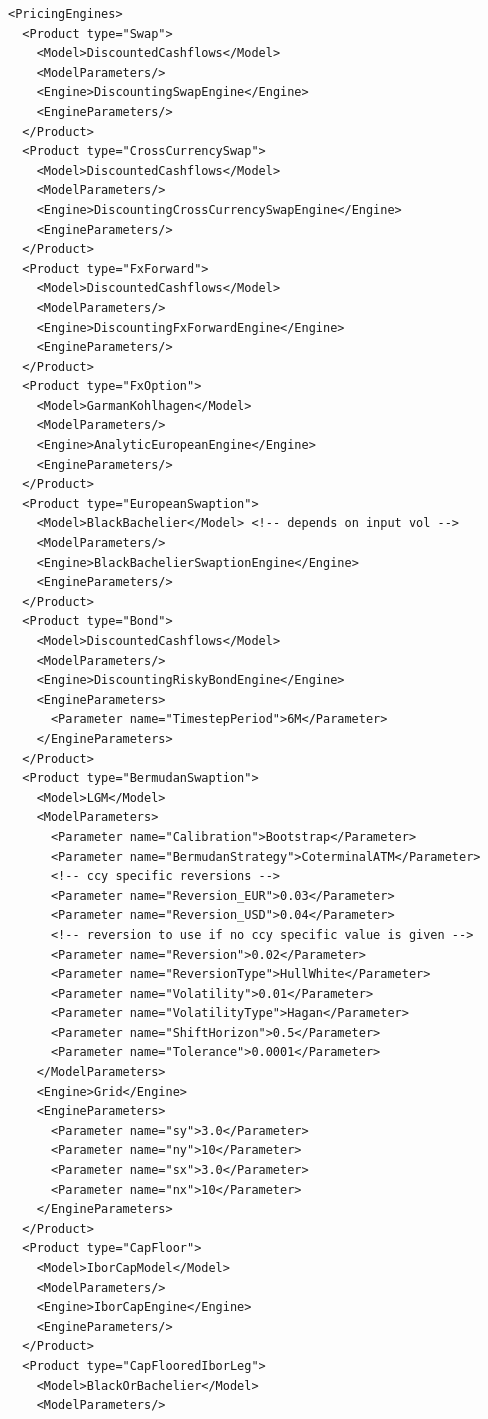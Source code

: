 \documentclass[12pt, a4paper]{article}
\newenvironment{longlisting}{\captionsetup{type=listing}}{}
\begin{document}
{{\begin{longlisting}
\begin{verbatim}
<PricingEngines>
  <Product type="Swap">
    <Model>DiscountedCashflows</Model>
    <ModelParameters/>
    <Engine>DiscountingSwapEngine</Engine>
    <EngineParameters/>
  </Product>
  <Product type="CrossCurrencySwap">
    <Model>DiscountedCashflows</Model>
    <ModelParameters/>
    <Engine>DiscountingCrossCurrencySwapEngine</Engine>
    <EngineParameters/>
  </Product>
  <Product type="FxForward">
    <Model>DiscountedCashflows</Model>
    <ModelParameters/>
    <Engine>DiscountingFxForwardEngine</Engine>
    <EngineParameters/>
  </Product>
  <Product type="FxOption">
    <Model>GarmanKohlhagen</Model>
    <ModelParameters/>
    <Engine>AnalyticEuropeanEngine</Engine>
    <EngineParameters/>
  </Product>
  <Product type="EuropeanSwaption">
    <Model>BlackBachelier</Model> <!-- depends on input vol -->
    <ModelParameters/>
    <Engine>BlackBachelierSwaptionEngine</Engine>
    <EngineParameters/>
  </Product>
  <Product type="Bond">
    <Model>DiscountedCashflows</Model>
    <ModelParameters/>
    <Engine>DiscountingRiskyBondEngine</Engine>
    <EngineParameters>
      <Parameter name="TimestepPeriod">6M</Parameter>
    </EngineParameters>
  </Product>
  <Product type="BermudanSwaption">
    <Model>LGM</Model>
    <ModelParameters>
      <Parameter name="Calibration">Bootstrap</Parameter>
      <Parameter name="BermudanStrategy">CoterminalATM</Parameter>
      <!-- ccy specific reversions -->
      <Parameter name="Reversion_EUR">0.03</Parameter>
      <Parameter name="Reversion_USD">0.04</Parameter>
      <!-- reversion to use if no ccy specific value is given -->
      <Parameter name="Reversion">0.02</Parameter>
      <Parameter name="ReversionType">HullWhite</Parameter>
      <Parameter name="Volatility">0.01</Parameter>
      <Parameter name="VolatilityType">Hagan</Parameter>
      <Parameter name="ShiftHorizon">0.5</Parameter>
      <Parameter name="Tolerance">0.0001</Parameter>
    </ModelParameters>
    <Engine>Grid</Engine>
    <EngineParameters>
      <Parameter name="sy">3.0</Parameter>
      <Parameter name="ny">10</Parameter>
      <Parameter name="sx">3.0</Parameter>
      <Parameter name="nx">10</Parameter>
    </EngineParameters>
  </Product>
  <Product type="CapFloor">
    <Model>IborCapModel</Model>
    <ModelParameters/>
    <Engine>IborCapEngine</Engine>
    <EngineParameters/>
  </Product>
  <Product type="CapFlooredIborLeg">
    <Model>BlackOrBachelier</Model>
    <ModelParameters/>

\end{verbatim}
\end{longlisting}}}
\end{document}
